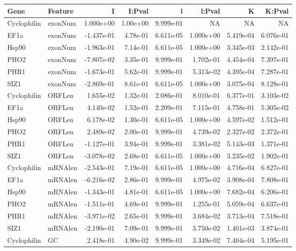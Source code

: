 \documentclass{standalone}
\begin{document}
\begin{tabular}{llrrrrrr}
\toprule
Gene & Feature & I & I:Pval & l & l:Pval & K & K:Pval \\ 
\midrule
Cyclophilin & exonNum &  1.000e+00 & 1.00e+00 & 9.999e-01 &        NA &        NA &        NA \\ 
EF1a & exonNum & -1.437e-01 & 4.78e-01 & 6.611e-05 & 1.000e+00 & 5.419e-04 & 6.076e-01 \\ 
Hsp90 & exonNum & -1.963e-01 & 7.14e-01 & 6.611e-05 & 1.000e+00 & 3.345e-03 & 2.142e-01 \\ 
PHO2 & exonNum & -7.807e-02 & 3.35e-01 & 9.999e-01 & 1.702e-01 & 4.454e-04 & 7.397e-01 \\ 
PHR1 & exonNum & -1.673e-01 & 5.62e-01 & 9.999e-01 & 5.313e-02 & 4.395e-04 & 7.287e-01 \\ 
SIZ1 & exonNum & -2.869e-01 & 8.61e-01 & 6.611e-05 & 1.000e+00 & 3.075e-04 & 8.128e-01 \\ 
Cyclophilin & ORFLen &  1.655e-02 & 1.32e-01 & 2.086e-01 & 8.010e-01 & 6.377e-01 & 3.103e-02 \\ 
EF1a & ORFLen &  4.140e-02 & 1.52e-01 & 2.209e-01 & 7.115e-01 & 4.758e-01 & 5.305e-02 \\ 
Hsp90 & ORFLen &  6.178e-02 & 1.30e-01 & 6.611e-05 & 1.000e+00 & 4.597e-02 & 1.512e-01 \\ 
PHO2 & ORFLen &  2.489e-02 & 2.00e-01 & 9.999e-01 & 4.739e-02 & 2.327e-02 & 2.372e-01 \\ 
PHR1 & ORFLen & -1.127e-01 & 3.94e-01 & 9.999e-01 & 3.381e-02 & 5.143e-03 & 1.371e-01 \\ 
SIZ1 & ORFLen & -3.078e-02 & 2.68e-01 & 6.611e-05 & 1.000e+00 & 3.235e-02 & 1.902e-01 \\ 
Cyclophilin & mRNAlen & -2.543e-01 & 7.19e-01 & 6.611e-05 & 1.000e+00 & 4.716e-04 & 6.827e-01 \\ 
EF1a & mRNAlen & -6.216e-02 & 2.86e-01 & 9.999e-01 & 4.975e-02 & 3.908e-04 & 7.808e-01 \\ 
Hsp90 & mRNAlen & -1.343e-01 & 4.81e-01 & 6.611e-05 & 1.000e+00 & 7.682e-04 & 6.206e-01 \\ 
PHO2 & mRNAlen & -1.511e-01 & 4.69e-01 & 9.999e-01 & 1.255e-01 & 5.059e-04 & 6.637e-01 \\ 
PHR1 & mRNAlen & -3.971e-02 & 2.65e-01 & 9.999e-01 & 3.684e-02 & 3.713e-04 & 7.518e-01 \\ 
SIZ1 & mRNAlen & -2.190e-01 & 7.09e-01 & 9.999e-01 & 3.750e-02 & 1.401e-03 & 3.874e-01 \\ 
Cyclophilin & GC &  2.418e-01 & 4.90e-02 & 9.999e-01 & 3.349e-02 & 7.404e-04 & 5.195e-01 \\ 

\end{tabular}
\end{document}
